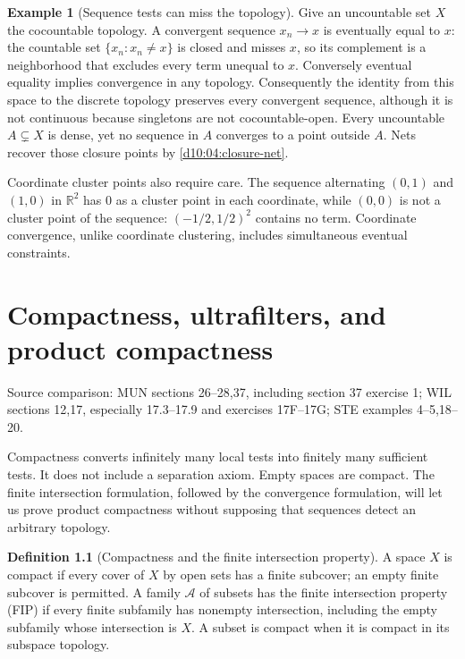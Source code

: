 \documentclass[11pt,oneside,openany]{book}
\theoremstyle{definition}
\newtheorem{definition}[theorem]{Definition}
\newtheorem{example}[theorem]{Example}
\theoremstyle{remark}
\newcommand{\R}{\mathbb R}\newcommand{\C}{\mathbb C}
\newcommand{\source}[1]{\par\begingroup\small\sffamily\color{black!65}Source comparison: #1\par\endgroup}
\begin{document}
\begin{example}[Sequence tests can miss the topology]\label{d10:04:sequence-failure}
Give an uncountable set $X$ the cocountable topology. A convergent sequence $x_n\to x$ is eventually equal to $x$: the countable set $\{x_n:x_n\ne x\}$ is closed and misses $x$, so its complement is a neighborhood that excludes every term unequal to $x$. Conversely eventual equality implies convergence in any topology. Consequently the identity from this space to the discrete topology preserves every convergent sequence, although it is not continuous because singletons are not cocountable-open. Every uncountable $A\subsetneq X$ is dense, yet no sequence in $A$ converges to a point outside $A$. Nets recover those closure points by \cref{d10:04:closure-net}.

Coordinate cluster points also require care. The sequence alternating $(0,1)$ and $(1,0)$ in $\R^2$ has $0$ as a cluster point in each coordinate, while $(0,0)$ is not a cluster point of the sequence: $(-1/2,1/2)^2$ contains no term. Coordinate convergence, unlike coordinate clustering, includes simultaneous eventual constraints.
\end{example}



\chapter{Compactness, ultrafilters, and product compactness}\label{ch:d10-05}
\source{MUN sections 26--28,37, including section 37 exercise 1; WIL sections 12,17, especially 17.3--17.9 and exercises 17F--17G; STE examples 4--5,18--20.}

Compactness converts infinitely many local tests into finitely many sufficient tests. It does not include a separation axiom. Empty spaces are compact. The finite intersection formulation, followed by the convergence formulation, will let us prove product compactness without supposing that sequences detect an arbitrary topology.

\begin{definition}[Compactness and the finite intersection property]\label{d10:05:compact}
A space $X$ is compact if every cover of $X$ by open sets has a finite subcover; an empty finite subcover is permitted. A family $\mathcal A$ of subsets has the finite intersection property (FIP) if every finite subfamily has nonempty intersection, including the empty subfamily whose intersection is $X$. A subset is compact when it is compact in its subspace topology.
\end{definition}
\end{document}
